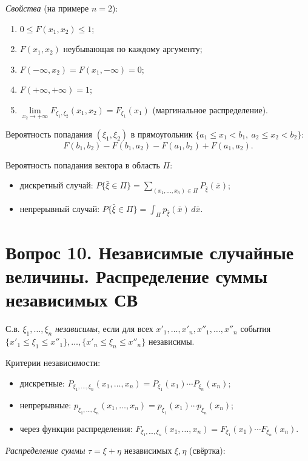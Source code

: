 \textit{Свойства} (на примере $n=2$):
\begin{enumerate}
  \item $0\le F(x_1,x_2)\le1$;
  \item $F(x_1,x_2)$ неубывающая по каждому аргументу;
  \item $F(-\infty,x_2)=F(x_1,-\infty)=0$;
  \item $F(+\infty,+\infty)=1$;
  \item $\lim\limits_{x_2\to+\infty}F_{\xi_1,\xi_2}(x_1,x_2)=F_{\xi_1}(x_1)$ (маргинальное распределение).
\end{enumerate}

Вероятность попадания $(\xi_1,\xi_2)$ в прямоугольник $\{a_1\le x_1<b_1,\ a_2\le x_2<b_2\}$:
\[ F(b_1,b_2)-F(b_1,a_2)-F(a_1,b_2)+F(a_1,a_2). \]

Вероятность попадания вектора в область $\Pi$:
\begin{itemize}
  \item дискретный случай: $P\{\bar\xi\in\Pi\}=\sum_{(x_1,\dots,x_n)\in\Pi}P_{\bar\xi}(\bar x)$;
  \item непрерывный случай: $P\{\bar\xi\in\Pi\}=\int_\Pi p_{\bar\xi}(\bar x)\,d\bar x$.
\end{itemize}

\section*{Вопрос 10. Независимые случайные величины. Распределение суммы независимых СВ}

С.в. $\xi_1,\dots,\xi_n$ \textit{независимы}, если для всех $x'_1,\dots,x'_n,x''_1,\dots,x''_n$ события $\{x'_1\le\xi_1\le x''_1\},\dots,\{x'_n\le\xi_n\le x''_n\}$ независимы.

Критерии независимости:
\begin{itemize}
  \item дискретные: $P_{\xi_1,\dots,\xi_n}(x_1,\dots,x_n)=P_{\xi_1}(x_1)\cdots P_{\xi_n}(x_n)$;
  \item непрерывные: $p_{\xi_1,\dots,\xi_n}(x_1,\dots,x_n)=p_{\xi_1}(x_1)\cdots p_{\xi_n}(x_n)$;
  \item через функции распределения: $F_{\xi_1,\dots,\xi_n}(x_1,\dots,x_n)=F_{\xi_1}(x_1)\cdots F_{\xi_n}(x_n)$.
\end{itemize}

\textit{Распределение суммы} $\tau=\xi+\eta$ независимых $\xi,\eta$ (свёртка):

